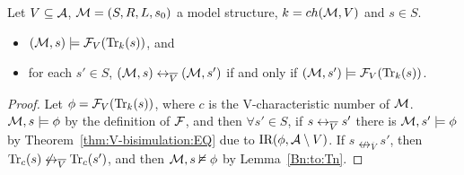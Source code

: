 \documentclass{article}
\begin{document}
\begin{lemma}\label{div_s}
Let $V\subseteq {\cal A}$, ${\cal M}=(S,R,L,s_0)$ a model structure, $k={ch({\cal M},V)}$ and $s\in S$.
\begin{itemize}
  \item $({\cal M}, s)\models {\cal F}_V(\textrm{Tr}_k(s))$, and
  \item for each $s'\in S$, $({\cal M},s) \leftrightarrow_{\overline V} ({\cal M},s')$
  if and only if $({\cal M},s')\models{\cal F}_V(\textrm{Tr}_k(s))$.
\end{itemize}
\end{lemma}
\begin{proof}
Let $\phi = {\cal F}_V(\textrm{Tr}_k(s))$, where $c$ is the V-characteristic number of ${\cal M}$. ${\cal M}, s \models \phi$ by the definition of ${\cal F}$, and then $\forall s' \in S$, if $s \leftrightarrow_{\overline V} s'$ there is ${\cal M}, s' \models \phi$ by Theorem~\ref{thm:V-bisimulation:EQ} due to $\textrm{IR}(\phi, {\cal A} \setminus V)$. If $s \nleftrightarrow_{\overline V} s'$, then $\textrm{Tr}_c(s) \not \leftrightarrow_{\overline V} \textrm{Tr}_c(s')$, and then ${\cal M}, s\nvDash \phi$ by Lemma~\ref{Bn:to:Tn}.
\end{proof}
\end{document}
